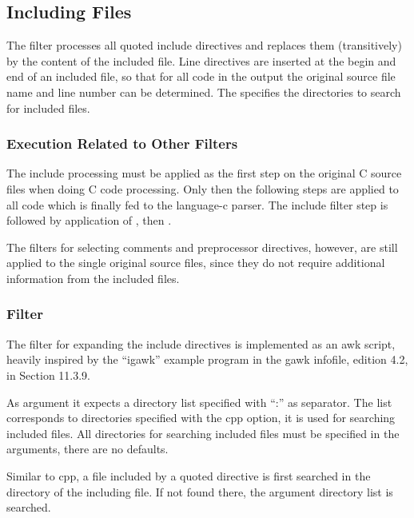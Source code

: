  

\subsection{Including Files}

The filter  processes all quoted include directives and replaces them (transitively) by the 
content of the included file. Line directives are inserted at the begin and end of an included file, so that
for all code in the output the original source file name and line number can be determined. The 
specifies the directories to search for included files.

\subsubsection{Execution Related to Other Filters}

The include processing must be applied as the first step on the original C source files when doing C code processing.
Only then the following steps are applied to all code which is finally fed to the language-c parser. The
include filter step is followed by application of , then .

The filters for selecting comments and preprocessor directives, however, are still applied to the single
original source files, since they do not require additional information from the included files.

\subsubsection{Filter }

The filter for expanding the include directives is implemented as an awk script, heavily inspired by the ``igawk''
example program in the gawk infofile, edition 4.2, in Section 11.3.9.

As argument it expects a directory list specified with ``:'' as separator. The list corresponds
to directories specified with the  cpp option, it is used for searching included files.
All directories for searching included files must be specified in the arguments, there are no defaults.

Similar to cpp, a file included by a quoted directive is first searched in the directory of the including file. 
If not found there, the argument directory list is searched.

